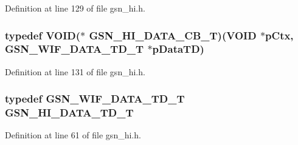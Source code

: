 Definition at line 129 of file gsn\_\-hi.h.

\hypertarget{a00504_a01ca163707bf2c00971f4e2a9b96fb46}{
\subsubsection[{GSN\_\-HI\_\-DATA\_\-CB\_\-T}]{\setlength{\rightskip}{0pt plus 5cm}typedef VOID($\ast$ {\bf GSN\_\-HI\_\-DATA\_\-CB\_\-T})(VOID $\ast$pCtx, {\bf GSN\_\-WIF\_\-DATA\_\-TD\_\-T} $\ast$pDataTD)}}
\label{a00504_a01ca163707bf2c00971f4e2a9b96fb46}


Definition at line 131 of file gsn\_\-hi.h.

\hypertarget{a00504_a31706a5b40c3056a0b743a89f6c05133}{
\subsubsection[{GSN\_\-HI\_\-DATA\_\-TD\_\-T}]{\setlength{\rightskip}{0pt plus 5cm}typedef {\bf GSN\_\-WIF\_\-DATA\_\-TD\_\-T} {\bf GSN\_\-HI\_\-DATA\_\-TD\_\-T}}}
\label{a00504_a31706a5b40c3056a0b743a89f6c05133}


Definition at line 61 of file gsn\_\-hi.h.

